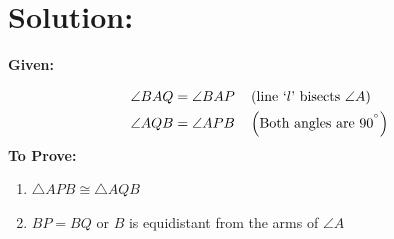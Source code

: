 \documentclass[10pt]{article}
\providecommand{\brak}[1]{\ensuremath{\left(#1\right)}}
\begin{document}
\section*{Solution:}
\textbf{Given:}

\begin{align}
\angle{BAQ} &= \angle{BAP} \quad \brak{\text{line \text{`$l$'} bisects $\angle{A}$}}\\
\angle{AQB} &= \angle{APB} \quad \brak{\text{Both angles are $90^{\degree}$}}
\end{align}
\textbf{To Prove:}
\begin{enumerate}
\item $\triangle{APB} \cong \triangle{AQB}$
\item $BP = BQ$ or $B$ is equidistant from the arms of $\angle{A}$
\end{enumerate}
\end{document}
